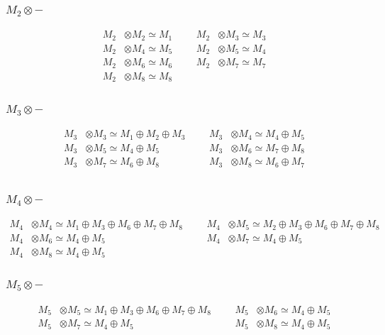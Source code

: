 \subsubsection{$ M_{2}\otimes -$}
\begin{align*}
M_{2} &\otimes M_{2} \simeq M_{1} &&& M_{2} &\otimes M_{3} \simeq M_{3}\\
M_{2} &\otimes M_{4} \simeq M_{5} &&& M_{2} &\otimes M_{5} \simeq M_{4}\\
M_{2} &\otimes M_{6} \simeq M_{6} &&& M_{2} &\otimes M_{7} \simeq M_{7}\\
M_{2} &\otimes M_{8} \simeq M_{8}
\end{align*}

\subsubsection{$ M_{3}\otimes -$}
\begin{align*}
M_{3} &\otimes M_{3} \simeq M_{1} \oplus M_{2} \oplus M_{3} &&& M_{3} &\otimes M_{4} \simeq M_{4} \oplus M_{5}\\
M_{3} &\otimes M_{5} \simeq M_{4} \oplus M_{5} &&& M_{3} &\otimes M_{6} \simeq M_{7} \oplus M_{8}\\
M_{3} &\otimes M_{7} \simeq M_{6} \oplus M_{8} &&& M_{3} &\otimes M_{8} \simeq M_{6} \oplus M_{7}\\
\end{align*}

\subsubsection{$ M_{4}\otimes -$}
\begin{align*}
M_{4} &\otimes M_{4} \simeq M_{1} \oplus M_{3} \oplus M_{6} \oplus M_{7} \oplus M_{8} &&& M_{4} &\otimes M_{5} \simeq M_{2} \oplus M_{3} \oplus M_{6} \oplus M_{7} \oplus M_{8}\\
M_{4} &\otimes M_{6} \simeq M_{4} \oplus M_{5} &&& M_{4} &\otimes M_{7} \simeq M_{4} \oplus M_{5}\\
M_{4} &\otimes M_{8} \simeq M_{4} \oplus M_{5}
\end{align*}

\subsubsection{$ M_{5}\otimes -$}
\begin{align*}
M_{5} &\otimes M_{5} \simeq M_{1} \oplus M_{3} \oplus M_{6} \oplus M_{7} \oplus M_{8} &&& M_{5} &\otimes M_{6} \simeq M_{4} \oplus M_{5}\\
M_{5} &\otimes M_{7} \simeq M_{4} \oplus M_{5} &&& M_{5} &\otimes M_{8} \simeq M_{4} \oplus M_{5}\\
\end{align*}

